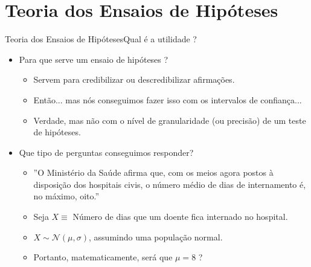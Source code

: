 \documentclass[10,5pt, pdf]{beamer}
\begin{document}
\section{Teoria dos Ensaios de Hipóteses}\label{sec:ex1}
\begin{frame}{Teoria dos Ensaios de Hipóteses}{Qual é a utilidade ?}
\begin{itemize}
    \item{Para que serve um ensaio de hipóteses ?}
    \begin{itemize}
    \pause
        \item{Servem para credibilizar ou descredibilizar afirmações.}
        \pause
        \item{Então... mas nós conseguimos fazer isso com os intervalos de confiança...}
        \pause
        \item{Verdade, mas não com o nível de granularidade (ou precisão) de um teste de hipóteses.}
    \end{itemize}
    \pause
\item{Que tipo de perguntas conseguimos responder?}
\pause
\begin{itemize}
\pause
    \item{''O Ministério da Saúde afirma que, com os meios agora postos à disposição dos hospitais civis, o número médio de dias de internamento é, no máximo, oito.''}
    \pause
    \item{Seja $X\equiv$ Número de dias que um doente fica internado no hospital.}
    \pause
    \item{$X \sim \mathcal{N}(\mu, \sigma)$, assumindo uma população normal.}
    \pause
    \item{Portanto, matematicamente, será que $\mu=8$ ?}
\end{itemize}

\end{itemize}
\end{frame}
\end{document}
